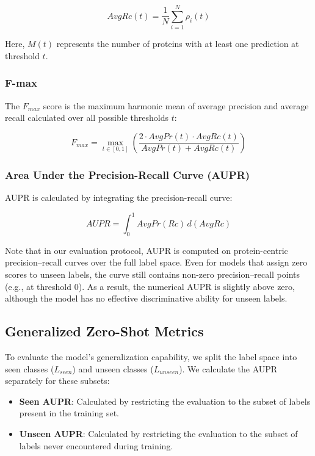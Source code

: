\documentclass{article}
\begin{document}
\begin{equation}
    AvgRc(t) = \frac{1}{N} \sum_{i=1}^{N} \rho_i(t)
\end{equation}

Here, $M(t)$ represents the number of proteins with at least one prediction at threshold $t$.

\subsubsection{F-max}
The $F_{max}$ score is the maximum harmonic mean of average precision and average recall calculated over all possible thresholds $t$:

\begin{equation}
    F_{max} = \max_{t \in [0, 1]} \left( \frac{2 \cdot AvgPr(t) \cdot AvgRc(t)}{AvgPr(t) + AvgRc(t)} \right)
\end{equation}

\subsubsection{Area Under the Precision-Recall Curve (AUPR)}
AUPR is calculated by integrating the precision-recall curve:

\begin{equation}
    AUPR = \int_{0}^{1} AvgPr(Rc) \, d(AvgRc)
\end{equation}

Note that in our evaluation protocol, AUPR is computed on protein-centric precision–recall curves over the full label space. Even for models that assign zero scores to unseen labels, the curve still contains non-zero precision–recall points (e.g., at threshold 0). As a result, the numerical AUPR is slightly above zero, although the model has no effective discriminative ability for unseen labels.

\subsection{Generalized Zero-Shot Metrics}

To evaluate the model's generalization capability, we split the label space into seen classes ($L_{seen}$) and unseen classes ($L_{unseen}$). We calculate the AUPR separately for these subsets:

\begin{itemize}
    \item \textbf{Seen AUPR}: Calculated by restricting the evaluation to the subset of labels present in the training set.
    \item \textbf{Unseen AUPR}: Calculated by restricting the evaluation to the subset of labels never encountered during training.
\end{itemize}
\end{document}
